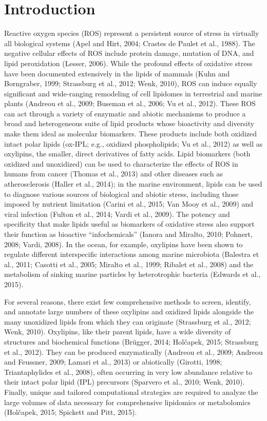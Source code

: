 \section{Introduction}
Reactive oxygen species (ROS) represent a persistent source of stress in virtually all biological systems (Apel and Hirt, 2004; Crastes de Paulet et al., 1988). The negative cellular effects of ROS include protein damage, mutation of DNA, and lipid peroxidation (Lesser, 2006). While the profound effects of oxidative stress have been documented extensively in the lipids of mammals (Kuhn and Borngraber, 1999; Strassburg et al., 2012; Wenk, 2010), ROS can induce equally significant and wide-ranging remodeling of cell lipidomes in terrestrial and marine plants (Andreou et al., 2009; Buseman et al., 2006; Vu et al., 2012). These ROS can act through a variety of enzymatic and abiotic mechanisms to produce a broad and heterogeneous suite of lipid products whose bioactivity and diversity make them ideal as molecular biomarkers. These products include both oxidized intact polar lipids (ox-IPL; e.g., oxidized phospholipids; Vu et al., 2012) as well as oxylipins, the smaller, direct derivatives of fatty acids. Lipid biomarkers (both oxidized and unoxidized) can be used to characterize the effects of ROS in humans from cancer (Thomas et al., 2013) and other diseases such as atherosclerosis (Haller et al., 2014); in the marine environment, lipids can be used to diagnose various sources of biological and abiotic stress, including those imposed by nutrient limitation (Carini et al., 2015; Van Mooy et al., 2009) and viral infection (Fulton et al., 2014; Vardi et al., 2009). The potency and specificity that make lipids useful as biomarkers of oxidative stress also support their function as bioactive ``infochemicals'' (Ianora and Miralto, 2010; Pohnert, 2008; Vardi, 2008). In the ocean, for example, oxylipins have been shown to regulate different interspecific interactions among marine microbiota (Balestra et al., 2011; Casotti et al., 2005; Miralto et al., 1999; Ribalet et al., 2008) and the metabolism of sinking marine particles by heterotrophic bacteria (Edwards et al., 2015).

For several reasons, there exist few comprehensive methods to screen, identify, and annotate large numbers of these oxylipins and oxidized lipids alongside the many unoxidized lipids from which they can originate (Strassburg et al., 2012; Wenk, 2010). Oxylipins, like their parent lipids, have a wide diversity of structures and biochemical functions (Br\"{u}gger, 2014; Hol\v{c}apek, 2015; Strassburg et al., 2012). They can be produced enzymatically (Andreou et al., 2009; Andreou and Feussner, 2009; Lamari et al., 2013) or abiotically (Girotti, 1998; Triantaphylides et al., 2008), often occurring in very low abundance relative to their intact polar lipid (IPL) precursors (Sparvero et al., 2010; Wenk, 2010). Finally, unique and tailored computational strategies are required to analyze the large volumes of data necessary for comprehensive lipidomics or metabolomics (Hol\v{c}apek, 2015; Spickett and Pitt, 2015).

